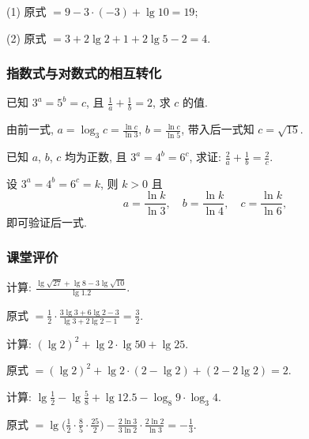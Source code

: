   \beginsolution
    (1) 原式 $=9-3\cdot(-3)+\lg10=19$;
    
    (2) 原式 $=3+2\lg2+1+2\lg5-2= 4$.
  \endsolution
  
  \subsubsection{指数式与对数式的相互转化}
  \begin{example}
    已知 $3^a =5^b =c$, 且 $\frac1a + \frac1b =2$, 求 $c$ 的值.
  \end{example}

  \beginsolution
    由前一式, $a=\log_3 c=\frac{\ln c}{\ln3}$, $b= \frac{\ln c}{\ln5}$, 带入后一式知 $c=\sqrt{15}$.
  \endsolution
  
  \lianxi
  \begin{exercise}[s]
    已知 $a$, $b$, $c$ 均为正数, 且 $3^a =4^b =6^c$, 求证:
    $\frac2a+ \frac1b= \frac2c$.
  \end{exercise}

  \beginsolution
    设 $3^a =4^b =6^c=k$, 则 $k>0$ 且
    \[a=\frac{\ln k}{\ln 3},\quad b=\frac{\ln k}{\ln 4},\quad 
      c=\frac{\ln k}{\ln6},\]
    即可验证后一式.
  \endsolution
  
  \subsubsection{课堂评价}
  \begin{exercise}
    计算: $\frac{\lg\sqrt{27}+\lg8-3\lg\sqrt{10}}{\lg1.2}$.
  \end{exercise}

  \beginsolution
    原式 $=\frac12\cdot\frac{3\lg3+6\lg2-3}{\lg3+2\lg2-1}=\frac32$.
  \endsolution
  
  \begin{exercise}
    计算: $(\lg2)^2 +\lg2\cdot \lg50+\lg25$.
  \end{exercise}

  \beginsolution
    原式 $=(\lg2)^2 +\lg2\cdot (2-\lg2)+(2-2\lg2)=2$.
  \endsolution
  
  \begin{exercise}
    计算: $\lg\frac12 -\lg\frac58 +\lg12.5-\log_8 9\cdot\log_3 4$.
  \end{exercise}

  \beginsolution
    原式 $=\lg\Big(\frac12\cdot\frac85\cdot\frac{25}2\Big)- \frac{2\ln3}{3\ln2}\cdot\frac{2\ln2}{\ln3}= -\frac13$.
  \endsolution

